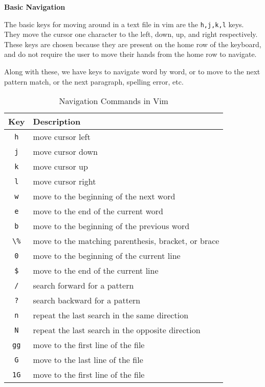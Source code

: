 \textbf{Basic Navigation}

The basic keys for moving around in a text file in vim
are the \lstinline|h,j,k,l| keys. They move the cursor
one character to the left, down, up, and right respectively.
These keys are chosen because they are present on the
home row of the keyboard, and do not require the user
to move their hands from the home row to navigate.

Along with these, we have keys to navigate word by word,
or to move to the next pattern match, or the next
paragraph, spelling error, etc.

\begin{table*}[h!]
  \caption{Navigation Commands in Vim}
  \begin{tabular}{c l}
    \toprule
    Key & Description \\
    \midrule
    \lstinline|h| & move cursor left \\
    \lstinline|j| & move cursor down \\
    \lstinline|k| & move cursor up \\
    \lstinline|l| & move cursor right \\
    \lstinline|w| & move to the beginning of the next word \\
    \lstinline|e| & move to the end of the current word \\
    \lstinline|b| & move to the beginning of the previous word \\
    \lstinline|\%| & move to the matching parenthesis, bracket, or brace \\
    \lstinline|0| & move to the beginning of the current line \\
    \lstinline|$| & move to the end of the current line \\
    \lstinline|/| & search forward for a pattern \\
    \lstinline|?| & search backward for a pattern \\
    \lstinline|n| & repeat the last search in the same direction \\
    \lstinline|N| & repeat the last search in the opposite direction \\
    \lstinline|gg| & move to the first line of the file \\
    \lstinline|G| & move to the last line of the file \\
    \lstinline|1G| & move to the first line of the file \\

\end{tabular}
\end{table*}
